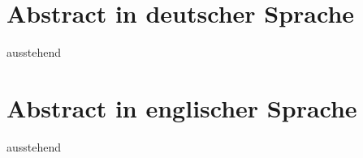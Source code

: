 \section*{Abstract in deutscher Sprache}

ausstehend

\acresetall

\newpage \section*{Abstract in englischer Sprache}

ausstehend

\acresetall
